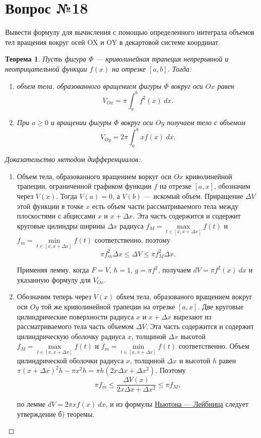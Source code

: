 \documentclass[12pt]{report}
\numberwithin{equation}{section}
\newtheorem{theorem}{Теорема}[section]
\begin{document}
\newpage \section{Вопрос №18} %
\begin{framed}
Вывести формулу для вычисления с помощью определенного интеграла объемов тел вращения вокруг осей OX и OY в декартовой системе координат.
\end{framed}

\begin{theorem} \label{th:18:1}
Пусть фигура $\Phi$ --- криволинейная трапеция непрерывной и неотрицательной функции $f(x)$ на отрезке $[a,b]$. Тогда:
\begin{enumerate}
\item[a)] объем тела, образованного вращением фигуры $\Phi$ вокруг оси $Ox$ равен
\[ V_{Ox} = \pi \int_a^b f^2(x)~dx.\]
\item[б)] При $a \geqslant 0$ и вращении фигуры $\Phi$ вокруг оси $Oy$ получаем тело с объемом
\[ V_{Oy} = 2 \pi \int_a^b x f(x)~dx.\]
\end{enumerate}
\end{theorem}
\begin{proof}[Доказательство методом дифференциалов:]
~\\
\begin{enumerate}
\item[a)] Объем тела, образованного вращением воркуг оси $Ox$ криволинейной трапеции, ограниченной графиком функции $f$ на отрезке $[a,x]$, обозначим через $V(x)$. Тогда $V(a) = 0$, а $V(b)$ --- искомый объем. Приращение $\Delta V$ этой функции в точке $x$ есть объем части рассматриваемого тела между плоскостями с абциссами $x$ и $x + \Delta x$. Эта часть содержится и содержит круговые цилиндры ширины $\Delta x$ радиуса $f_M = \max\limits_{t \in [x, x + \Delta x]} f(t)$ и $f_m = \min\limits_{t \in [x, x + \Delta x]}f(t)$ соответственно, поэтому
\[ \pi f^2_m \Delta x \leqslant \Delta V \leqslant \pi f^2_M \Delta x.\]

Применяя лемму, когда $F = V$, $h = 1$, $g = \pi f^2$, получаем $dV = \pi f^2(x)~dx$ и указанную формулу для $V_{Ox}$.

\item[б)] Обозначим теперь через $V(x)$ обхем тела, образованого вращением вокруг оси $Oy$ той же криволинейной трапеции на отрезке  $[a,x]$. Две круговые цилиндрические поверхности радиуса $x$ и $x + \Delta x$ вырезают из рассматриваемого тела часть объемом $\Delta V$. Эта часть содержится и содержит цилиндрическую оболочку радиуса $x$, толщиной $\Delta x$ высотой  $f_M = \max\limits_{t \in [x, x + \Delta x]} f(t)$ и $f_m = \min\limits_{t \in [x, x + \Delta x]}f(t)$ соответственно. Объем цилиндрической оболочки радиуса $x$, толщиной $\Delta x$ и высотой $h$ равен $\pi (x + \Delta x)^2 h - \pi x^2 h = \pi h(2x \Delta x + \Delta x^2)$. Поэтому
\[ \pi f_m \leqslant \frac{\Delta V(x)}{2x \Delta x + \Delta x^2} \leqslant \pi f_M,\]

по лемме $dV = 2\pi x f(x)~dx$, и из формулы  \hyperref[th:11:1]{Ньютона --- Лейбница} следует утверждение б) теоремы.
\end{enumerate}
\end{proof}
\end{document}
